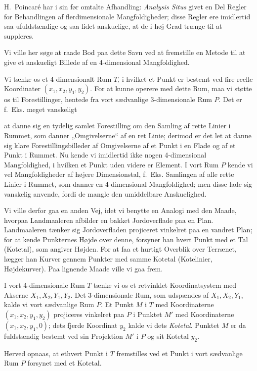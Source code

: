 \documentclass{article}
\begin{document}
H.~Poincaré har i sin før omtalte Afhandling: \emph{Analysis Situs} givet en Del Regler for Behandlingen af flerdimensionale Mangfoldigheder; disse Regler ere imidlertid saa ufuldstændige og saa lidet anskuelige, at de i høj Grad trænge til at suppleres.

Vi ville her søge at raade Bod paa dette Savn ved at fremstille en Metode til at give et anskueligt Billede af en 4-dimensional Mangfoldighed.

Vi tænke os et 4-dimensionalt Rum $T$, i hvilket et Punkt er bestemt ved fire reelle Koordinater $(x_1, x_2, y_1, y_2)$. For at kunne operere med dette Rum, maa vi støtte os til Forestillinger, hentede fra vort sædvanlige 3-dimensionale Rum $P$. Det er f.~Eks. meget vanskeligt

at danne sig en tydelig samlet Forestilling om den Samling af rette Linier i Rummet, som danner „Omgivelserne“ af en ret Linie; derimod er det let at danne sig klare Forestillingsbilleder af Omgivelserne af et Punkt i en Flade og af et Punkt i Rummet. Nu kende vi imidlertid ikke nogen 4-dimensional Mangfoldighed, i hvilken et Punkt uden videre er Element. I vort Rum $P$ kende vi vel Mangfoldigheder af højere Dimensionstal, f.~Eks. Samlingen af alle rette Linier i Rummet, som danner en 4-dimensional Mangfoldighed; men disse lade sig vanskelig anvende, fordi de mangle den umiddelbare Anskuelighed.

Vi ville derfor gaa en anden Vej, idet vi benytte en Analogi med den Maade, hvorpaa Landmaaleren afbilder en bakket Jordoverflade paa en Plan. Landmaaleren tænker sig Jordoverfladen projiceret vinkelret paa en vandret Plan; for at kende Punkternes Højde over denne, forsyner han hvert Punkt med et Tal (Kotetal), som angiver Højden. For at faa et hurtigt Overblik over Terrænet, lægger han Kurver gennem Punkter med samme Kotetal (Kotelinier, Højdekurver). Paa lignende Maade ville vi gaa frem.

I vort 4-dimensionale Rum $T$ tænke vi os et retvinklet Koordinatsystem med Akserne $X_1, X_2, Y_1, Y_2$. Det 3-dimensionale Rum, som udspændes af $X_1, X_2, Y_1$, kalde vi vort sædvanlige Rum $P$. Et Punkt $M$ i $T$ med Koordinaterne $(x_1, x_2, y_1, y_2)$ projiceres vinkelret paa $P$ i Punktet $M'$ med Koordinaterne $(x_1, x_2, y_1, 0)$; dets fjerde Koordinat $y_2$ kalde vi dets \emph{Kotetal}. Punktet $M$ er da fuldstændig bestemt ved sin Projektion $M'$ i $P$ og sit Kotetal $y_2$.

Herved opnaas, at ethvert Punkt i $T$ fremstilles ved et Punkt i vort sædvanlige Rum $P$ forsynet med et Kotetal.
\end{document}
